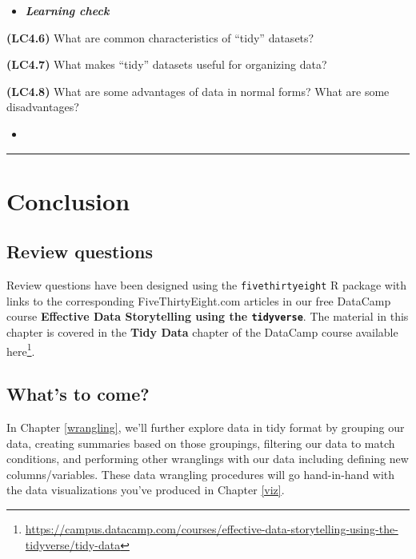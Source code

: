 \documentclass[12pt,]{krantz}
\renewcommand{\href}[2]{#2\footnote{\url{#1}}}
\newenvironment{rmdblock}[1]
  {\begin{shaded*}
  \begin{itemize}
  \renewcommand{\labelitemi}{
    \raisebox{-.7\height}[0pt][0pt]{
    }
  }
  \item
  }
  {
  \end{itemize}
  \end{shaded*}
  }
\newenvironment{learncheck}
  {\begin{rmdblock}{warning}}
  {\end{rmdblock}}
\theoremstyle{definition}
\theoremstyle{definition}
\theoremstyle{definition}
\theoremstyle{remark}
\begin{document}
\begin{learncheck}
\textbf{\emph{Learning check}}
\end{learncheck}

\textbf{(LC4.6)} What are common characteristics of ``tidy'' datasets?

\textbf{(LC4.7)} What makes ``tidy'' datasets useful for organizing
data?

\textbf{(LC4.8)} What are some advantages of data in normal forms? What
are some disadvantages?

\begin{learncheck}

\end{learncheck}

\begin{center}\rule{0.5\linewidth}{\linethickness}\end{center}

\section{Conclusion}\label{conclusion-2}

\subsection{Review questions}\label{review-questions-1}

Review questions have been designed using the \texttt{fivethirtyeight} R
package \citep{R-fivethirtyeight} with links to the corresponding
FiveThirtyEight.com articles in our free DataCamp course
\textbf{Effective Data Storytelling using the \texttt{tidyverse}}. The
material in this chapter is covered in the \textbf{Tidy Data} chapter of
the DataCamp course available
\href{https://campus.datacamp.com/courses/effective-data-storytelling-using-the-tidyverse/tidy-data}{here}.

\subsection{What's to come?}\label{whats-to-come-2}

In Chapter \ref{wrangling}, we'll further explore data in tidy format by
grouping our data, creating summaries based on those groupings,
filtering our data to match conditions, and performing other wranglings
with our data including defining new columns/variables. These data
wrangling procedures will go hand-in-hand with the data visualizations
you've produced in Chapter \ref{viz}.
\end{document}
